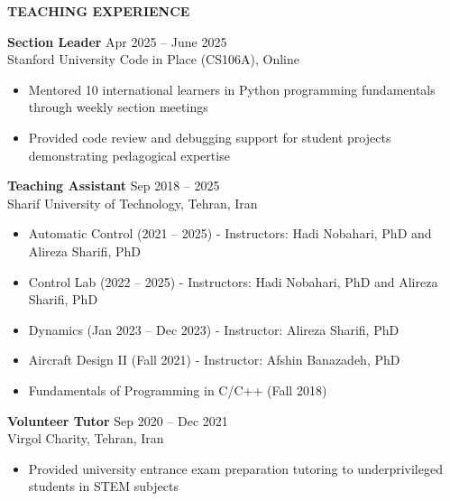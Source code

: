 \documentclass[12pt]{article}
\begin{document}
\vspace{8pt}

\begin{center}
	{\noindent \bfseries TEACHING EXPERIENCE}
\end{center}

\vspace{-4pt}

\noindent
\textbf{Section Leader} \hfill Apr 2025 -- June 2025 \\
Stanford University Code in Place (CS106A), Online

\begin{itemize} \itemsep -2pt
	\item Mentored 10 international learners in Python programming fundamentals through weekly section meetings
	\item Provided code review and debugging support for student projects demonstrating pedagogical expertise
\end{itemize}

\vspace{4pt}

\noindent
\textbf{Teaching Assistant} \hfill Sep 2018 -- 2025 \\
Sharif University of Technology, Tehran, Iran

\begin{itemize} \itemsep -2pt
	\item Automatic Control (2021 -- 2025) - Instructors: Hadi Nobahari, PhD and Alireza Sharifi, PhD
	\item Control Lab (2022 -- 2025) - Instructors: Hadi Nobahari, PhD and Alireza Sharifi, PhD
	\item Dynamics (Jan 2023 -- Dec 2023) - Instructor: Alireza Sharifi, PhD
	\item Aircraft Design II (Fall 2021) - Instructor: Afshin Banazadeh, PhD
	\item Fundamentals of Programming in C/C++ (Fall 2018)
\end{itemize}

\vspace{4pt}

\noindent
\textbf{Volunteer Tutor} \hfill Sep 2020 -- Dec 2021 \\
Virgol Charity, Tehran, Iran

\begin{itemize} \itemsep -2pt
	\item Provided university entrance exam preparation tutoring to underprivileged students in STEM subjects
\end{itemize}
\end{document}

